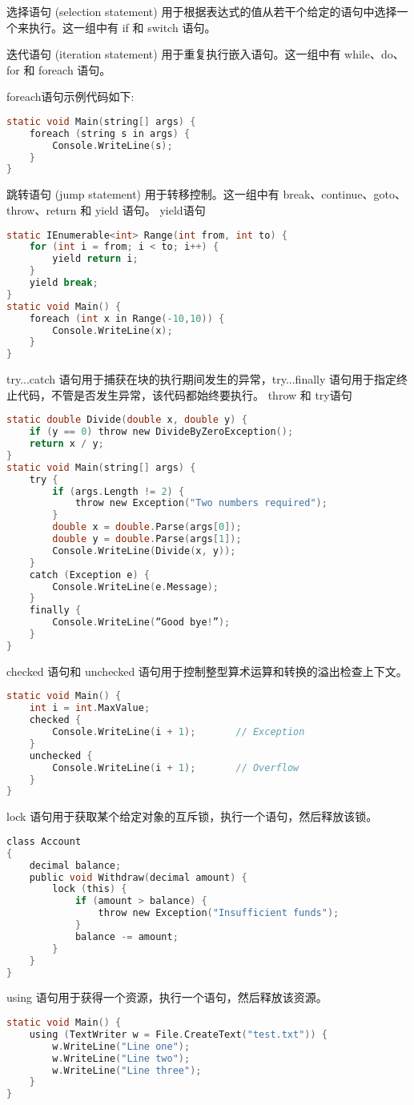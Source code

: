 选择语句 (selection statement) 用于根据表达式的值从若干个给定的语句中选择一个来执行。这一组中有 if 和 switch 语句。

迭代语句 (iteration statement) 用于重复执行嵌入语句。这一组中有 while、do、for 和 foreach 语句。

foreach语句示例代码如下:
\begin{lstlisting}[language=C]
static void Main(string[] args) {
    foreach (string s in args) {
        Console.WriteLine(s);
    }
}
\end{lstlisting}


跳转语句 (jump statement) 用于转移控制。这一组中有 break、continue、goto、throw、return 和 yield 语句。
yield语句
\begin{lstlisting}[language=C]
static IEnumerable<int> Range(int from, int to) {
    for (int i = from; i < to; i++) {
        yield return i;
    }
    yield break;
}
static void Main() {
    foreach (int x in Range(-10,10)) {
        Console.WriteLine(x);
    }
}
\end{lstlisting}

try...catch 语句用于捕获在块的执行期间发生的异常，try...finally 语句用于指定终止代码，不管是否发生异常，该代码都始终要执行。
throw 和 try语句
 \begin{lstlisting}[language=C]
 static double Divide(double x, double y) {
    if (y == 0) throw new DivideByZeroException();
    return x / y;
}
static void Main(string[] args) {
    try {
        if (args.Length != 2) {
            throw new Exception("Two numbers required");
        }
        double x = double.Parse(args[0]);
        double y = double.Parse(args[1]);
        Console.WriteLine(Divide(x, y));
    }
    catch (Exception e) {
        Console.WriteLine(e.Message);
    }
    finally {
        Console.WriteLine(“Good bye!”);
    }
}
\end{lstlisting}

checked 语句和 unchecked 语句用于控制整型算术运算和转换的溢出检查上下文。
 \begin{lstlisting}[language=C]
static void Main() {
    int i = int.MaxValue;
    checked {
        Console.WriteLine(i + 1);       // Exception
    }
    unchecked {
        Console.WriteLine(i + 1);       // Overflow
    }
}
\end{lstlisting}

lock 语句用于获取某个给定对象的互斥锁，执行一个语句，然后释放该锁。
 \begin{lstlisting}[language=C]
class Account
{
    decimal balance;
    public void Withdraw(decimal amount) {
        lock (this) {
            if (amount > balance) {
                throw new Exception("Insufficient funds");
            }
            balance -= amount;
        }
    }
}
\end{lstlisting}

using 语句用于获得一个资源，执行一个语句，然后释放该资源。
 \begin{lstlisting}[language=C]
static void Main() {
    using (TextWriter w = File.CreateText("test.txt")) {
        w.WriteLine("Line one");
        w.WriteLine("Line two");
        w.WriteLine("Line three");
    }
}
\end{lstlisting}


